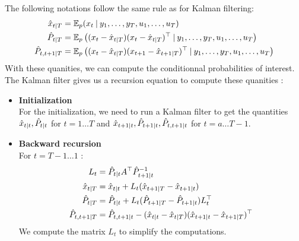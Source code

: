 The following notations follow the same rule as for Kalman filtering:
\begin{align*}
  \hat{x}_{t \mathbin{\vert} T} &= \mathbb{E}_p(x_t \mathbin{\vert} y_1, \ldots , y_T, u_1, \ldots , u_T) \\
  \hat{P}_{t \mathbin{\vert} T} &= \mathbb{E}_p \left((x_t - \hat{x}_{t \mathbin{\vert} T})(x_t - \hat{x}_{t \mathbin{\vert} T})^{\top} \mathbin{\vert} y_1, \ldots , y_T, u_1, \ldots , u_T \right) \\
  \hat{P}_{t,t+1 \mathbin{\vert} T} &= \mathbb{E}_p \left((x_t - \hat{x}_{t \mathbin{\vert} T})(x_{t+1} - \hat{x}_{t+1 \mathbin{\vert} T})^{\top} \mathbin{\vert} y_1, \ldots , y_T, u_1, \ldots , u_T \right) \\
\end{align*}
With these quanities, we can compute the conditionnal probabilities of interest.
The Kalman filter gives us a recursion equation to compute these quanities :
\begin{itemize}
  \item \textbf{Initialization}\\
    For the initialization, we need to run a Kalman filter to get the quantities $\hat{x}_{t \mathbin{\vert} t}, \hat{P}_{t \mathbin{\vert} t}$ for $t=1 \ldots T$ and $\hat{x}_{t+1 \mathbin{\vert} t}, \hat{P}_{t+1 \mathbin{\vert} t}, \hat{P}_{t,t+1 \mathbin{\vert} t}$ for $t=a \ldots T-1$.
  \item \textbf{Backward recursion}\\
    For $t=T-1 \ldots 1$ :
    \begin{align*}
      L_t &= \hat{P}_{t \mathbin{\vert} t}A^{\top}\hat{P}_{t+1 \mathbin{\vert} t}^{-1}\\
      \hat{x}_{t \mathbin{\vert} T} &= \hat{x}_{t \mathbin{\vert} t} + L_t(\hat{x}_{t+1 \mathbin{\vert} T} - \hat{x}_{t+1 \mathbin{\vert} t})\\
      \hat{P}_{t \mathbin{\vert} T} &= \hat{P}_{t \mathbin{\vert} t} + L_t(\hat{P}_{t+1 \mathbin{\vert} T} - \hat{P}_{t+1 \mathbin{\vert} t})L_t^{\top}\\
      \hat{P}_{t,t+1 \mathbin{\vert} T} &= \hat{P}_{t,t+1 \mathbin{\vert} t} - (\hat{x}_{t \mathbin{\vert} t} - \hat{x}_{t \mathbin{\vert} T})(\hat{x}_{t+1 \mathbin{\vert} t} - \hat{x}_{t+1 \mathbin{\vert} T})^{\top}\\
    \end{align*}
    We compute the matrix $L_{t}$ to simplify the computations.
\end{itemize}

